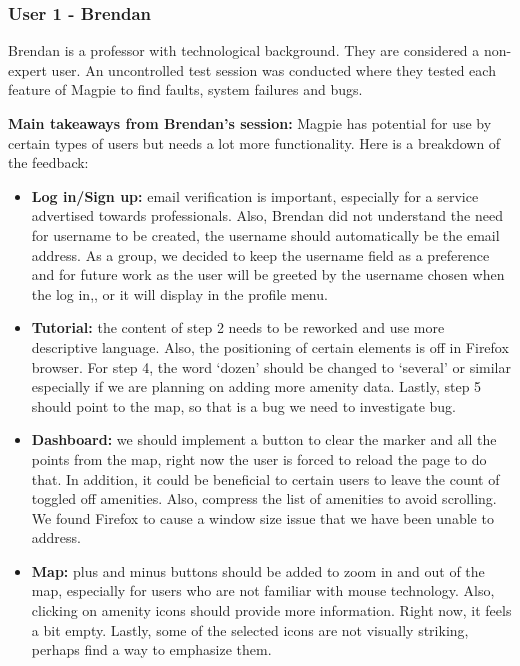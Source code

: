 \subsubsection{User 1 - Brendan}
Brendan is a professor with technological background. They are considered a
non-expert user. An uncontrolled test session was conducted where they tested
each feature of Magpie to find faults, system failures and bugs.

\textbf{Main takeaways from Brendan's session: }Magpie has potential for use by certain types of users but needs a lot more functionality. Here is a breakdown of the feedback:
\begin{itemize}
    \item \textbf{Log in/Sign up: } email verification is important, especially
    for a service advertised towards professionals. Also, Brendan did not
    understand the need for username to be created, the username should
    automatically be the email address. As a group, we decided to keep the
    username field as a preference and for future work as the user will be
    greeted by the username chosen when the log in,, or it will display in the
    profile menu.
    \vspace{0.2cm}

    \item \textbf{Tutorial: }the content of step 2 needs to be reworked and use
    more descriptive language. Also, the positioning of certain elements is off
    in Firefox browser. For step 4, the word `dozen' should be changed to
    `several' or similar especially if we are planning on adding more amenity
    data. Lastly, step 5 should point to the map, so that is a bug we need to
    investigate bug.
    \vspace{0.2cm}

    \item \textbf{Dashboard: }we should implement a button to clear the marker
    and all the points from the map, right now the user is forced to reload the
    page to do that. In addition, it could be beneficial to certain users to
    leave the count of toggled off amenities. Also, compress the list of
    amenities to avoid scrolling. We found Firefox to cause a window size
    issue that we have been unable to address.
    \vspace{0.2cm}

    \item \textbf{Map: } plus and minus buttons should be added to zoom in and
    out of the map, especially for users who are not familiar with mouse
    technology. Also, clicking on amenity icons should provide more information.
    Right now, it feels a bit empty. Lastly, some of the selected icons are not
    visually striking, perhaps find a way to emphasize them.
    \vspace{0.2cm}


\end{itemize}
